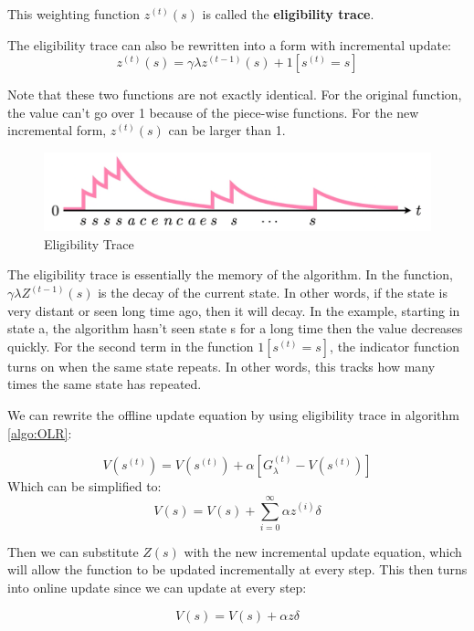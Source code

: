 \documentclass[11pt]{article}
\begin{document}
This weighting function $z^{(t)}(s)$ is called the \textbf{eligibility trace}.

The eligibility trace can also be rewritten into a form with incremental update:\\
\begin{equation}
    z^{(t)}(s) = \gamma \lambda z^{(t-1)}(s) + 1[s^{(t)} = s]
\end{equation}

Note that these two functions are not exactly identical. For the original function, the value can't go over 1 because of the piece-wise functions. For the new incremental form, $z^{(t)}(s)$ can be larger than 1.
\begin{figure}[H]
    \centering
    \includegraphics[width=0.5\linewidth]{images/Eligibility Trace.png}
    \caption{Eligibility Trace}
    \label{fig:lambda-return_params}
\end{figure}

The eligibility trace is essentially the memory of the algorithm. In the function, $\gamma \lambda Z^{(t-1)}(s)$ is the decay of the current state. In other words, if the state is very distant or seen long time ago, then it will decay. In the example, starting in state a, the algorithm hasn't seen state s for a long time then the value decreases quickly. For the second term in the function $1[s^{(t)} = s]$, the indicator function turns on when the same state repeats. In other words, this tracks how many times the same state has repeated. 

We can rewrite the offline update equation by using eligibility trace in algorithm \ref{algo:OLR}:

$$V(s^{(t)}) = V(s^{(t)}) + \alpha [G_{\lambda}^{(t)} - V(s^{(t)})]$$ Which can be simplified to: 
\begin{equation}
V(s) = V(s) + \sum_{i=0}^\infty \alpha z^{(i)} \delta
\end{equation}

Then we can substitute $Z(s)$ with the new incremental update equation, which will allow the function to be updated incrementally at every step. This then turns into online update since we can update at every step:

\begin{equation}
V(s) = V(s) + \alpha z \delta
\end{equation}
\end{document}
